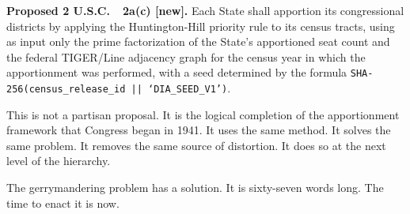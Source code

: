 \begin{statute}
\noindent\textbf{Proposed 2 U.S.C.\ \usca{}\ 2a(c) [new].}
Each State shall apportion its congressional districts by applying the
Huntington-Hill priority rule to its census tracts, using as input only
the prime factorization of the State's apportioned seat count and the
federal TIGER/Line adjacency graph for the census year in which the
apportionment was performed, with a seed determined by the formula
\texttt{SHA-256(census\_release\_id || `DIA\_SEED\_V1')}.
\end{statute}

This is not a partisan proposal.
It is the logical completion of the apportionment framework that Congress
began in 1941.
It uses the same method.
It solves the same problem.
It removes the same source of distortion.
It does so at the next level of the hierarchy.

The gerrymandering problem has a solution.
It is sixty-seven words long.
The time to enact it is now.
